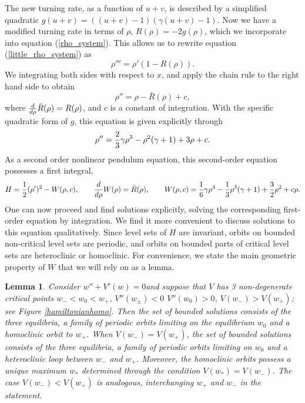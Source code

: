 \documentclass[10pt]{article}
\newtheorem{Lemma}{Lemma}[section]
\begin{document}
The new turning rate, as a function of $u+v$, is described by a simplified quadratic $g(u+v) = ((u+v)-1)(\gamma(u+v)-1)$. Now we have a modified turning rate in terms of $\rho$, $R(\rho) = -2g(\rho)$, which we incorporate into equation (\ref{rho_system}). This allows us to rewrite equation (\ref{little_rho_system}) as
\begin{equation}
\rho''' = \rho'(1-R(\rho)).
\label{little_new_system}
\end{equation}
We integrating both sides with respect to $x$, and apply the chain rule to the right hand side to obtain
\begin{equation}
\rho'' = \rho-\bar{R}(\rho) + c,
\label{rhopendulum}
\end{equation}
where ${d \over d \rho}\bar{R}(\rho) = R(\rho)$, and $c$ is a constant of integration. With the specific quadratic form of $g$, this equation is given explicitly through
\begin{equation}
\rho'' = {2\over3}\gamma\rho^3 - \rho^2(\gamma+1) + 3\rho+ c.
\end{equation}
As a second order nonlinear pendulum equation, this second-order equation possesses a first integral, 
\begin{equation}\label{e:1st}
H={1\over 2}(\rho')^2 -W(\rho,c),\qquad {d \over d \rho}W(\rho) =\bar{R}(\rho),\qquad  W(\rho, c) = {1\over6}\gamma\rho^4 - {1\over 3}\rho^3(\gamma+1) + {3 \over 2}\rho^2+ c\rho.
\end{equation}
One can now proceed and find solutions explicitly, solving the corresponding first-order equation by integration. We find it more convenient to discuss solutions to this equation qualitatively. Since level sets of $H$ are invariant, orbits on bounded non-critical level sets are periodic, and orbits on bounded parts of critical level sets are heteroclinic or homoclinic. For convenience, we state the main geometric property of $W$ that we will rely on as a lemma. 
\begin{Lemma}
Consider  $w'' + V'(w) = 0$and suppose that $V$ has 3 non-degenerate critical points $w_- < w_0 < w_+$,  $V''(w_{\pm}) < 0$ $V''(w_0)>0$, $V(w_-)>V(w_+)$; see Figure \ref{hamiltonianhomo}. 
Then the set of bounded solutions consists of the three equilibria, a family of periodic orbits limiting on the equilibrium $w_0$ and a homoclinic orbit to $w_+$. When $V(w_-)=V(w_+)$, the set of bounded solutions consists of the three equilibria, a family of periodic orbits limiting on $w_0$ and a heteroclinic loop between $w_-$ and $w_+$. 
Moreover, the homoclinic orbits possess a unique maximum $w_*$ determined through the condition $V(w_*)=V(w_-)$. The case $V(w_-)<V(w_+)$ is analogous, interchanging $w_+$ and $w_-$ in the statement. 
\label{hamiltonianhomo1}
\end{Lemma}
\end{document}
